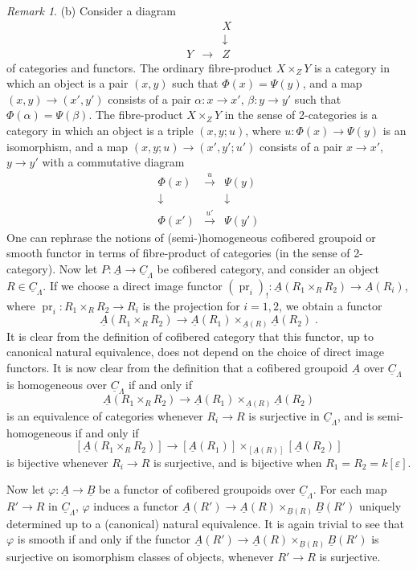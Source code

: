 \documentclass[11pt]{article}
\theoremstyle{plain}
\theoremstyle{definition}
\theoremstyle{remark}
\newtheorem{remark}[theorem]{Remark}
\newcommand{\uA}{\underline{A}}\newcommand{\uH}{\underline{H}}\newcommand{\uExt}{\underline{\operatorname{Ext}}}\newcommand{\uL}{\underline{L}}\newcommand{\uM}{\underline{M}}\newcommand{\uZ}{\underline{Z}}\newcommand{\uB}{\underline{B}}\newcommand{\uC}{\underline{C}}\newcommand{\uD}{\underline{D}}\newcommand{\uE}{\underline{E}}\newcommand{\uG}{\underline{G}}\newcommand{\uP}{\underline{P}}\newcommand{\uQ}{\underline{Q}}
\begin{document}
\begin{remark}
\textup{(b)} Consider a diagram
\[
\begin{array}{ccc}
& & X \\
& & \downarrow \\
Y & \longrightarrow & Z
\end{array}
\]
of categories and functors. The ordinary fibre-product $X \times_Z Y$ is a category in which an object is a pair $(x,y)$ such that $\Phi(x) = \Psi(y)$, and a map $(x,y) \to (x',y')$ consists of a pair $\alpha : x \to x'$, $\beta : y \to y'$ such that $\Phi(\alpha) = \Psi(\beta)$. The fibre-product $X \times_Z Y$ in the sense of 2-categories is a category in which an object is a triple $(x,y;u)$, where $u : \Phi(x) \to \Psi(y)$ is an isomorphism, and a map $(x,y;u) \to (x',y';u')$ consists of a pair $x \to x'$, $y \to y'$ with a commutative diagram
\[
\begin{array}{ccc}
\Phi(x) & \xrightarrow{u} & \Psi(y) \\
\downarrow & & \downarrow \\
\Phi(x') & \xrightarrow{u'} & \Psi(y')
\end{array}
\]
One can rephrase the notions of (semi-)homogeneous cofibered groupoid or smooth functor in terms of fibre-product of categories (in the sense of 2-category). Now let $P : \uA \to \underline{C}_{\Lambda}$ be cofibered category, and consider an object $R \in \underline{C}_{\Lambda}$. If we choose a direct image functor $(\operatorname{pr}_i)_! : \uA(R_1 \times_R R_2) \to \uA(R_i)$, where $\operatorname{pr}_i : R_1 \times_R R_2 \to R_i$ is the projection for $i = 1,2$, we obtain a functor
\[
\uA(R_1 \times_R R_2) \longrightarrow \uA(R_1) \times_{\uA(R)} \uA(R_2)\;.
\]
It is clear from the definition of cofibered category that this functor, up to canonical natural equivalence, does not depend on the choice of direct image functors. It is now clear from the definition that a cofibered groupoid $\uA$ over $\underline{C}_{\Lambda}$ is homogeneous over $\underline{C}_{\Lambda}$ if and only if
\[
\uA(R_1 \times_R R_2) \longrightarrow \uA(R_1) \times_{\uA(R)} \uA(R_2)
\]
is an equivalence of categories whenever $R_i \to R$ is surjective in $\underline{C}_{\Lambda}$, and is semi-homogeneous if and only if
\[
[\uA(R_1 \times_R R_2)] \longrightarrow [\uA(R_1)] \times_{[\uA(R)]} [\uA(R_2)]
\]
is bijective whenever $R_i \to R$ is surjective, and is bijective when $R_1 = R_2 = k[\varepsilon]$.

Now let $\varphi : \uA \to \uB$ be a functor of cofibered groupoids over $\underline{C}_{\Lambda}$. For each map $R' \to R$ in $\underline{C}_{\Lambda}$, $\varphi$ induces a functor $\uA(R') \to \uA(R) \times_{\uB(R)} \uB(R')$ uniquely determined up to a (canonical) natural equivalence. It is again trivial to see that $\varphi$ is smooth if and only if the functor $\uA(R') \to \uA(R) \times_{\uB(R)} \uB(R')$ is surjective on isomorphism classes of objects, whenever $R' \to R$ is surjective.


\end{remark}
\end{document}
